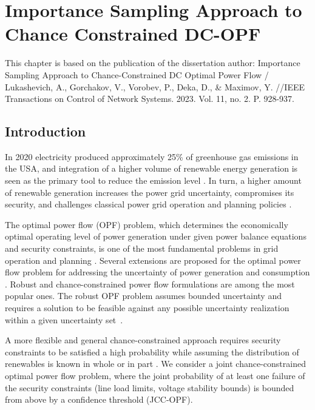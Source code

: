 \chapter{Importance Sampling Approach to Chance Constrained DC-OPF}
This chapter is based on the publication of the dissertation author: Importance Sampling Approach to Chance-Constrained DC Optimal Power Flow / Lukashevich, A., Gorchakov, V., Vorobev, P., Deka, D., \& Maximov, Y. //IEEE Transactions on Control of Network Systems. 2023. Vol. 11, no. 2. P. 928-937.
\label{chap:dc_stochastic_approx}

\section{Introduction}

In 2020 electricity produced approximately 25\% of greenhouse gas emissions in the USA, and integration of a higher volume of renewable energy generation is seen as the primary tool to reduce the emission level \cite{hockstad2018inventory}. In turn, a higher amount of renewable generation increases the power grid uncertainty, compromises its security, and challenges classical power grid operation and planning policies \cite{koutsoyiannis2016unavoidable}. 

The optimal power flow (OPF) problem, which determines the economically optimal operating level of power generation under given power balance equations and security constraints, is one of the most fundamental problems in grid operation and planning \cite{stott2012optimal}. Several extensions are proposed for the optimal power flow problem for addressing the uncertainty of power generation and consumption \cite{geng2019data}. Robust and chance-constrained power flow formulations are among the most popular ones. The robust OPF problem assumes bounded uncertainty and requires a solution to be feasible against any possible uncertainty realization within a given uncertainty set~\cite{ben2002robust,ding2016adjustable,sousa2010robust}. 

A more flexible and general chance-constrained approach requires security constraints to be satisfied a high probability while assuming the distribution of renewables is known in whole or in part \cite{lubin2015robust, roald2017chance,bienstock2014chance,pena2020dc,mitrovic2023gp,mitrovic2023data}. We consider a joint chance-constrained optimal power flow problem, where the joint probability of at least one failure of the security constraints (line load limits, voltage stability bounds) is bounded from above by a confidence threshold (JCC-OPF). 

